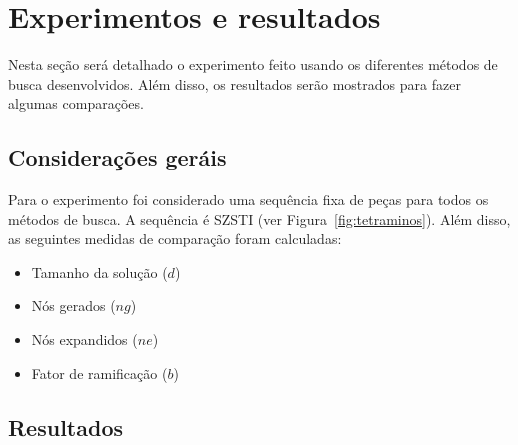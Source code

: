 \section{Experimentos e resultados}
\label{sec:experiments}

Nesta seção será detalhado o experimento feito usando os diferentes métodos de busca desenvolvidos. Além disso, os resultados serão mostrados para fazer algumas comparações.

\subsection{Considerações geráis}
\label{subsec:setup}
Para o experimento foi considerado uma sequência fixa de peças para todos os métodos de busca. A sequência é SZSTI (ver Figura~\ref{fig:tetraminos}). Além disso, as seguintes medidas de comparação foram calculadas:
\begin{itemize}
	\item Tamanho da solução ($d$)
	\item Nós gerados (${ng}$)
	\item Nós expandidos (${ne}$)
	\item Fator de ramificação ($b$)
\end{itemize}

\subsection{Resultados}
\label{subsec:results}

